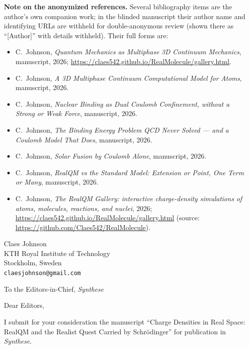 \documentclass[11pt]{article}
\begin{document}
\noindent\textbf{Note on the anonymized references.} Several bibliography items are the author's own
companion work; in the blinded manuscript their author name and identifying URLs are withheld for
double-anonymous review (shown there as ``[Author]'' with details withheld). Their full forms are:
\begin{itemize}
\item C.~Johnson, \emph{Quantum Mechanics as Multiphase 3D Continuum Mechanics}, manuscript, 2026;
\url{https://claes542.github.io/RealMolecule/gallery.html}.
\item C.~Johnson, \emph{A 3D Multiphase Continuum Computational Model for Atoms}, manuscript, 2026.
\item C.~Johnson, \emph{Nuclear Binding as Dual Coulomb Confinement, without a Strong or Weak Force},
manuscript, 2026.
\item C.~Johnson, \emph{The Binding Energy Problem QCD Never Solved --- and a Coulomb Model That Does},
manuscript, 2026.
\item C.~Johnson, \emph{Solar Fusion by Coulomb Alone}, manuscript, 2026.
\item C.~Johnson, \emph{RealQM vs the Standard Model: Extension or Point, One Term or Many}, manuscript,
2026.
\item C.~Johnson, \emph{The RealQM Gallery: interactive charge-density simulations of atoms, molecules,
reactions, and nuclei}, 2026; \url{https://claes542.github.io/RealMolecule/gallery.html} (source:
\url{https://github.com/Claes542/RealMolecule}).
\end{itemize}

\clearpage
\thispagestyle{empty}

\begin{flushright}
Claes Johnson\\
KTH Royal Institute of Technology\\
Stockholm, Sweden\\
\texttt{claesjohnson@gmail.com}
\end{flushright}

\vspace{1em}

\noindent To the Editors-in-Chief, \emph{Synthese}

\vspace{1em}

\noindent Dear Editors,

\medskip
\noindent I submit for your consideration the manuscript ``Charge Densities in Real Space: RealQM and the
Realist Quest Carried by Schr\"odinger'' for publication in \emph{Synthese}.
\end{document}
